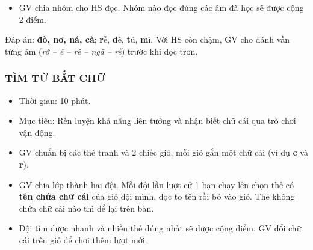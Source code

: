 \documentclass[../main.tex]{subfiles}
\begin{document}
\begin{itemize}
    \item[-] GV chia nhóm cho HS đọc. Nhóm nào đọc đúng các âm đã học sẽ được cộng 2 điểm.
\end{itemize}
\begin{luuy}
    Đáp án: \textbf{đò, nơ, ná, cà}; \textbf{r}ễ, \textbf{d}ê, \textbf{t}ủ, \textbf{m}ì. Với HS còn chậm, GV cho đánh vần từng âm (\textit{rờ -- ê -- rê -- ngã -- rễ}) trước khi đọc trơn.
\end{luuy}

\subsubsection{TÌM TỪ BẮT CHỮ}
\begin{hd}
    \begin{itemize}
        \item Thời gian: 10 phút.
        \item Mục tiêu: Rèn luyện khả năng liên tưởng và nhận biết chữ cái qua trò chơi vận động.
    \end{itemize}
\end{hd}
\begin{itemize}
    \item[-] GV chuẩn bị các thẻ tranh và 2 chiếc giỏ, mỗi giỏ gắn một chữ cái (ví dụ \textbf{c} và \textbf{r}).
    \item[-] GV chia lớp thành hai đội. Mỗi đội lần lượt cử 1 bạn chạy lên chọn thẻ có \textbf{tên chứa chữ cái} của giỏ đội mình, đọc to tên rồi bỏ vào giỏ. Thẻ không chứa chữ cái nào thì để lại trên bàn.
    \item[-] Đội tìm được nhanh và nhiều thẻ đúng nhất sẽ được cộng điểm. GV đổi chữ cái trên giỏ để chơi thêm lượt mới.
\end{itemize}
\end{document}
